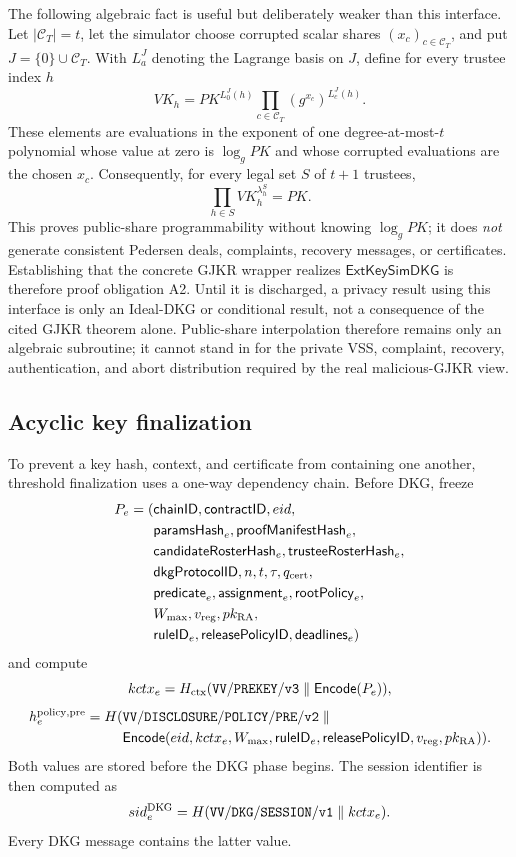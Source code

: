 \documentclass[pdflatex,sn-mathphys-num]{sn-jnl}%
\theoremstyle{thmstyleone}%
\theoremstyle{thmstyletwo}%
\theoremstyle{thmstylethree}%
\begin{document}
The following algebraic fact is useful but deliberately weaker than this
interface.  Let $|\mathcal C_T|=t$, let the simulator choose corrupted scalar
shares $(x_c)_{c\in\mathcal C_T}$, and put
$J=\{0\}\cup\mathcal C_T$.  With $L_a^J$ denoting the Lagrange basis on $J$,
define for every trustee index $h$
\[
 VK_h=PK^{L_0^J(h)}
       \prod_{c\in\mathcal C_T}(g^{x_c})^{L_c^J(h)}.
\]
These elements are evaluations in the exponent of one degree-at-most-$t$
polynomial whose value at zero is $\log_gPK$ and whose corrupted evaluations
are the chosen $x_c$.  Consequently, for every legal set $S$ of $t+1$
trustees,
\[
 \prod_{h\in S}VK_h^{\lambda_h^S}=PK.
\]
This proves public-share programmability without knowing $\log_gPK$; it does
\emph{not} generate consistent Pedersen deals, complaints, recovery messages,
or certificates.  Establishing that the concrete GJKR wrapper realizes
$\mathsf{ExtKeySimDKG}$ is therefore proof obligation A2.  Until it is
discharged, a privacy result using this interface is only an Ideal-DKG or
conditional result, not a consequence of the cited GJKR theorem alone.
Public-share interpolation therefore remains only an algebraic subroutine; it
cannot stand in for the private VSS, complaint, recovery, authentication, and
abort distribution required by the real malicious-GJKR view.

\subsection{Acyclic key finalization}
\label{subsec:threshold-finalization}

To prevent a key hash, context, and certificate from containing one another,
threshold finalization uses a one-way dependency chain.  Before DKG, freeze
\[
\begin{aligned}
 P_e=(&\mathsf{chainID},\mathsf{contractID},eid,\\
 &\mathsf{paramsHash}_e,\mathsf{proofManifestHash}_e,\\
 &\mathsf{candidateRosterHash}_e,\mathsf{trusteeRosterHash}_e,\\
 &\mathsf{dkgProtocolID},n,t,\tau,q_{\rm cert},\\
 &\mathsf{predicate}_e,\mathsf{assignment}_e,\mathsf{rootPolicy}_e,\\
 &W_{\max},v_{\rm reg},pk_{\rm RA},\\
 &\mathsf{ruleID}_e,\mathsf{releasePolicyID},\mathsf{deadlines}_e)
\end{aligned}
\]
and compute
\[
 kctx_e=H_{\rm ctx}(\mathtt{VV/PREKEY/v3}\parallel
                    \mathsf{Encode}(P_e)),
\]
\[
\begin{aligned}
 h_e^{\rm policy,pre}=H(&\mathtt{VV/DISCLOSURE/POLICY/PRE/v2}\parallel\\
 &\mathsf{Encode}(eid,kctx_e,W_{\max},\mathsf{ruleID}_e,
                  \mathsf{releasePolicyID},v_{\rm reg},pk_{\rm RA})).
\end{aligned}
\]
Both values are stored before the DKG phase begins.  The session identifier is
then computed as
\[
 sid_e^{\rm DKG}=H(\mathtt{VV/DKG/SESSION/v1}\parallel kctx_e).
\]
Every DKG message contains the latter value.
\end{document}
